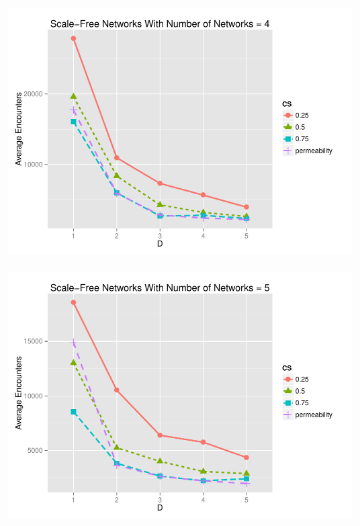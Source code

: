 \documentclass[preprint,number]{elsarticle}
\begin{document}
\begin{figure}[H]
\begin{subfigure}{.49\linewidth}
          \centering
          \includegraphics[width=1\linewidth]{"../analysis/pdf/context_switching_encounters_comp_sf_groupedbynets_4"}
          \caption{}
          \label{fig:ctx_switching_comp_sf_4}
	\end{subfigure}
	\begin{subfigure}{.5\linewidth}
          \centering
          \includegraphics[width=1\linewidth]{"../analysis/pdf/context_switching_encounters_comp_sf_groupedbynets_5"}
          \caption{}
          \label{fig:ctx_switching_comp_sf_5}
	\end{subfigure}
	\begin{minipage}{0.9\textwidth}
          \vspace{0.2cm}
          \caption{}
          \label{fig:ctx_switching_comp_sf}
	\end{minipage}
      \end{figure}
\end{document}
